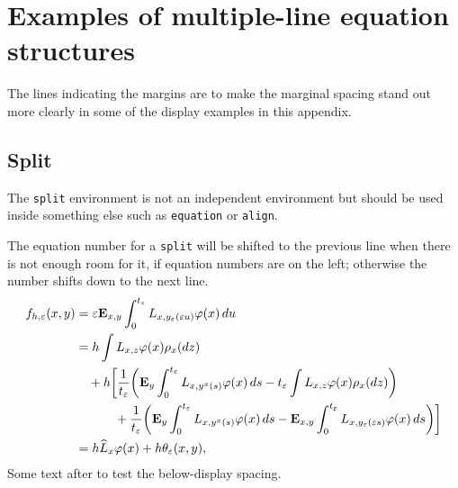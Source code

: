 \makeatother


\appendix
\section{Examples of multiple-line equation structures}
\label{s:eq}
The lines indicating the margins are to make the marginal
spacing stand out more clearly in some of
the display examples in this appendix.

\subsection{Split}
The {\tt split} environment is not an independent environment
but should be used inside something else such as {\tt equation}
or {\tt align}.

The equation number for a {\tt split} will be shifted to the previous line
when there is not enough room for it, if equation numbers are on the left;
otherwise the number shifts down to the next line.
\begin{equation}
\begin{split}
f_{h,\varepsilon}(x,y)
&=\varepsilon\bold E_{x,y}\int_0^{t_\varepsilon}
L_{x,y_\varepsilon(\varepsilon u)}\varphi(x)\,du\\
&= h\int L_{x,z}\varphi(x)\rho_x(dz)\\
&\quad+h\biggl[\frac{1}{t_\varepsilon}\biggl(\bold E_{y}
  \int_0^{t_\varepsilon}L_{x,y^x(s)}\varphi(x)\,ds
  -t_\varepsilon\int L_{x,z}\varphi(x)\rho_x(dz)\biggr)\\
&\phantom{{=}+h\biggl[}+\frac{1}{t_\varepsilon}
  \biggl(\bold E_{y}\int_0^{t_\varepsilon}L_{x,y^x(s)}
    \varphi(x)\,ds -\bold E_{x,y}\int_0^{t_\varepsilon}
   L_{x,y_\varepsilon(\varepsilon s)}
   \varphi(x)\,ds\biggr)\biggr]\\
&=h\widehat{L}_x\varphi(x)+h\theta_\varepsilon(x,y),
\end{split}
\end{equation}
Some text after to test the below-display spacing.

